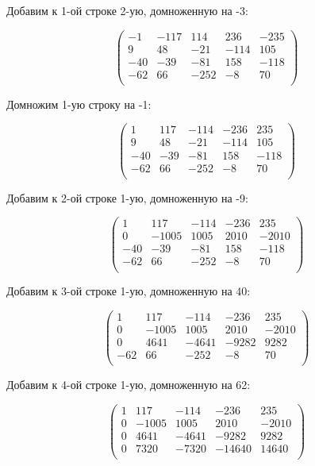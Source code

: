 	Добавим к 1-ой строке 2-ую, домноженную на -3:
	
	\[
	\begin{pmatrix}
	-1 & -117 & 114 & 236 & -235 \\
	9 & 48 & -21 & -114 & 105 \\
	-40 & -39 & -81 & 158 & -118 \\
	-62 & 66 & -252 & -8 & 70 \\
	\end{pmatrix}
	\]
	
	Домножим 1-ую строку на -1:
	
	\[
	\begin{pmatrix}
	1 & 117 & -114 & -236 & 235 \\
	9 & 48 & -21 & -114 & 105 \\
	-40 & -39 & -81 & 158 & -118 \\
	-62 & 66 & -252 & -8 & 70 \\
	\end{pmatrix}
	\]
	
	Добавим к 2-ой строке 1-ую, домноженную на -9:
	
	\[
	\begin{pmatrix}
	1 & 117 & -114 & -236 & 235 \\
	0 & -1005 & 1005 & 2010 & -2010 \\
	-40 & -39 & -81 & 158 & -118 \\
	-62 & 66 & -252 & -8 & 70 \\
	\end{pmatrix}
	\]
	
	Добавим к 3-ой строке 1-ую, домноженную на 40:
	
	\[
	\begin{pmatrix}
	1 & 117 & -114 & -236 & 235 \\
	0 & -1005 & 1005 & 2010 & -2010 \\
	0 & 4641 & -4641 & -9282 & 9282 \\
	-62 & 66 & -252 & -8 & 70 \\
	\end{pmatrix}
	\]
	
	Добавим к 4-ой строке 1-ую, домноженную на 62:
	
	\[
	\begin{pmatrix}
	1 & 117 & -114 & -236 & 235 \\
	0 & -1005 & 1005 & 2010 & -2010 \\
	0 & 4641 & -4641 & -9282 & 9282 \\
	0 & 7320 & -7320 & -14640 & 14640 \\
	\end{pmatrix}
	\]
	
